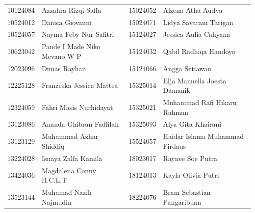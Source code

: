 \begin{tabular}{l l @{\hspace{1.2cm}} l l}
10124084 & Azzahra Rizqi Saffa & 15024052 & Alzena Atha Audya \\
10524012 & Danica Giovanni & 15024071 & Lidya Savarani Tarigan \\
10524057 & Nayma Feby Nur Safitri & 15124027 & Jessica Aulia Cahyana \\
10623042 & Pande I Made Niko Mevano W P & 15124032 & Qabil Radhiqa Handoyo \\
12023096 & Dimas Rayhan & 15124066 & Angga Setiawan \\
12225128 & Franzeska Jessica Mattea & 15325014 & Elja Manuella Joesta Damanik \\
12324059 & Fahri Masis Nurhidayat & 15325021 & Muhammad Rafi Hikaru Rahman \\
13123086 & Ananda Ghibran Fadlilah & 15325093 & Alya Gita Khairani \\
13123129 & Muhammad Azhar Shiddiq & 15524057 & Haidar Islama Muhammad Firdaus \\
13224028 & Isnaya Zalfa Kamila & 18023017 & Raynee Soe Putra \\
13424036 & Magdalena Conny H.C.L.T & 18124013 & Kayla Olivia Putri \\
13523144 & Muhamad Nazih Najmudin & 18224076 & Bram Sebastian Pangaribuan \\
\end{tabular}
